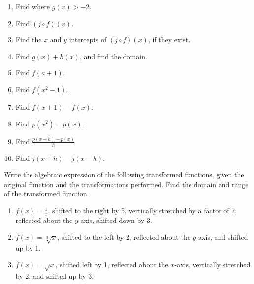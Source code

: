 \documentclass{ximera}
\begin{document}
\begin{exercise}
\begin{enumerate}
\item Find where $g(x)>-2$. 
\item Find $(j\circ f)(x)$. 
\item Find the $x$ and $y$ intercepts of $(j\circ f)(x)$, if they exist. 
\item Find $g(x)+h(x)$, and find the domain.
\item Find $f(a+1)$.
\item Find $f(x^2-1)$.
\item Find $f(x+1)-f(x)$.
\item Find $p(x^2)-p(x)$.
\item Find $\displaystyle \frac{p(x+h)-p(x)}{h}$
\item Find $\displaystyle j(x+h)-j(x-h)$.
\end{enumerate}

\end{exercise}


\begin{exercise}
Write the algebraic expression of the following transformed functions, given the original function and the transformations performed. Find the domain and range of the transformed function.  
\begin{enumerate}
\item $\displaystyle f(x)=\frac{1}{x}$, shifted to the right by 5, vertically stretched by a factor of 7, reflected about the $y$-axis, shifted down by 3. 
\item $f(x)=\sqrt[3]{x}$, shifted to the left by 2, reflected about the $y$-axis, and shifted up by 1.
\item $f(x)=\sqrt{x}$, shifted left by 1, reflected about the $x$-axis, vertically stretched by 2, and shifted up by 3.
\end{enumerate} 
\end{exercise}
\end{document}
